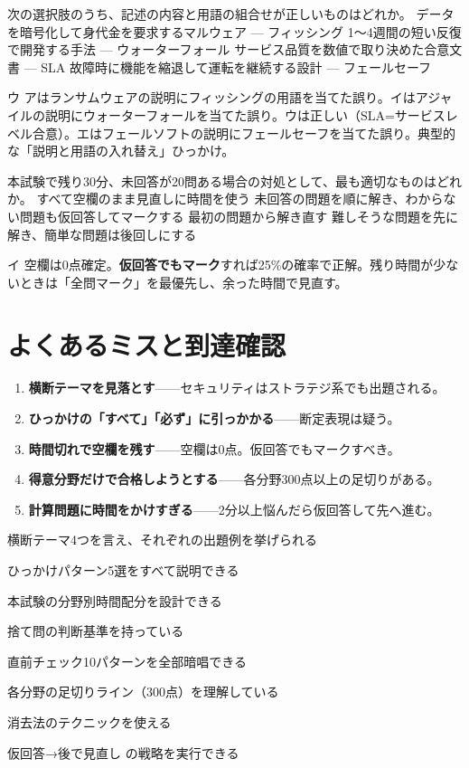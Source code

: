 \begin{itpmon}{%
次の選択肢のうち、記述の内容と用語の組合せが正しいものはどれか。}
\sentakushi
  {データを暗号化して身代金を要求するマルウェア — フィッシング}
  {1〜4週間の短い反復で開発する手法 — ウォーターフォール}
  {サービス品質を数値で取り決めた合意文書 — SLA}
  {故障時に機能を縮退して運転を継続する設計 — フェールセーフ}
\end{itpmon}
\begin{kaisetsu}{ウ}
アはランサムウェアの説明にフィッシングの用語を当てた誤り。イはアジャイルの説明にウォーターフォールを当てた誤り。ウは正しい（SLA=サービスレベル合意）。エはフェールソフトの説明にフェールセーフを当てた誤り。典型的な「説明と用語の入れ替え」ひっかけ。
\end{kaisetsu}

\begin{itpmon}{%
本試験で残り30分、未回答が20問ある場合の対処として、最も適切なものはどれか。}
\sentakushi
  {すべて空欄のまま見直しに時間を使う}
  {未回答の問題を順に解き、わからない問題も仮回答してマークする}
  {最初の問題から解き直す}
  {難しそうな問題を先に解き、簡単な問題は後回しにする}
\end{itpmon}
\begin{kaisetsu}{イ}
空欄は0点確定。\textbf{仮回答でもマーク}すれば25\%の確率で正解。残り時間が少ないときは「全問マーク」を最優先し、余った時間で見直す。
\end{kaisetsu}

\section{よくあるミスと到達確認}

\begin{yokumiss}[この章でよくあるミス]
\begin{enumerate}[leftmargin=1.6em, itemsep=5pt]
  \item \textbf{横断テーマを見落とす}——セキュリティはストラテジ系でも出題される。
  \item \textbf{ひっかけの「すべて」「必ず」に引っかかる}——断定表現は疑う。
  \item \textbf{時間切れで空欄を残す}——空欄は0点。仮回答でもマークすべき。
  \item \textbf{得意分野だけで合格しようとする}——各分野300点以上の足切りがある。
  \item \textbf{計算問題に時間をかけすぎる}——2分以上悩んだら仮回答して先へ進む。
\end{enumerate}
\end{yokumiss}

\begin{tatsaku}
  \item 横断テーマ4つを言え、それぞれの出題例を挙げられる
  \item ひっかけパターン5選をすべて説明できる
  \item 本試験の分野別時間配分を設計できる
  \item 捨て問の判断基準を持っている
  \item 直前チェック10パターンを全部暗唱できる
  \item 各分野の足切りライン（300点）を理解している
  \item 消去法のテクニックを使える
  \item 仮回答→後で見直し の戦略を実行できる
\end{tatsaku}
